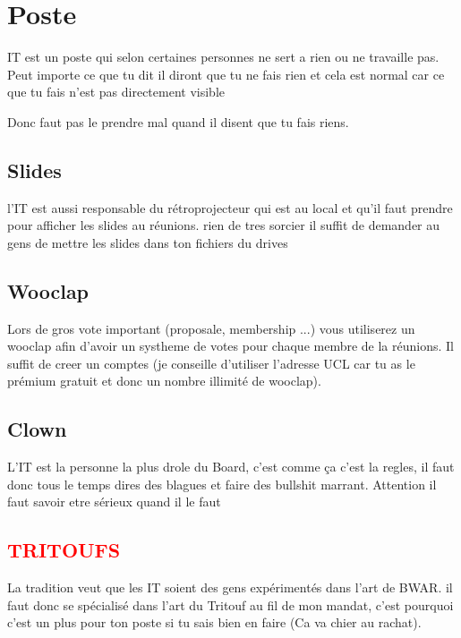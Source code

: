 \documentclass[12pt]{article}
\begin{document}
\section{Poste}

	IT est un poste qui selon certaines personnes ne sert a rien ou ne travaille pas. Peut importe ce que tu dit il diront que tu ne fais rien et cela est normal car ce que tu fais n'est pas directement visible
	
	Donc faut pas le prendre mal quand il disent que tu fais riens.
	\subsection{Slides}
	
	l'IT est aussi responsable du rétroprojecteur qui est au local et qu'il faut prendre pour afficher les slides au réunions. rien de tres sorcier il suffit de demander au gens de mettre les slides dans ton fichiers du drives
	
	\subsection{Wooclap}
		Lors de gros vote important (proposale, membership ...) vous utiliserez un wooclap afin d'avoir un systheme de votes pour chaque membre de la réunions. Il suffit de creer un comptes (je conseille d'utiliser l'adresse UCL car tu as le prémium gratuit et donc un nombre illimité de wooclap).
		
	\subsection{Clown}
		L'IT est la personne la plus drole du Board, c'est comme ça c'est la regles, il faut donc tous le temps dires des blagues et faire des bullshit marrant. Attention il faut savoir etre sérieux quand il le faut
	
	\subsection{\textcolor{red}{TRITOUFS}}
		
		La tradition veut que les IT soient des gens expérimentés dans l’art de BWAR. il faut donc se spécialisé dans l’art du Tritouf au fil de mon mandat, c’est pourquoi c’est un plus pour ton poste si tu sais bien en faire (Ca va chier au rachat). 
		
\end{document}
